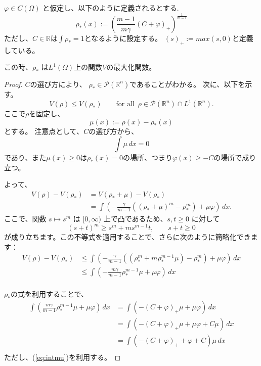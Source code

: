 \begin{lem}
    $\varphi \in C(\Omega)$ と仮定し、以下のように定義されるとする.
    $$
        \rho_*(x) := \left( \frac{m-1}{m\gamma}(C + \varphi)_+ \right)^{\frac{1}{m-1}} 
    $$
    ただし、$C \in \mathbb{R}$は$\int \rho_* = 1$となるように設定する。
    $(s)_+ := max(s, 0)$と定義している。

    この時、$\rho_*$ は$L^1(\Omega)$上の関数$V$の最大化関数。
\end{lem}
\begin{proof}
    $C$の選び方により、 $\rho_* \in \mathcal{P}(\mathbb{R}^n)$であることがわかる。
    次に、以下を示す。
    $$
    V(\rho) \leq V(\rho_*) \qquad \text{for all } \, \rho \in \mathcal{P}(\mathbb{R}^n) \cap L^1(\mathbb{R}^n).
    $$
    ここで$\rho$を固定し、 
    $$
    \mu(x) := \rho(x) - \rho_*(x)
    $$
    とする。
    注意点として、$C$の選び方から、
    \begin{equation}
        \label{eq:intmu}
        \int \mu \, dx = 0
    \end{equation}
    であり、また$\mu(x) \geq 0$は$\rho_*(x) = 0$の場所、つまり$\varphi(x) \geq -C$の場所で成り立つ。

    よって、
    \begin{align*}
        V(\rho) - V(\rho_*) &= V(\rho_* + \mu) - V(\rho_*)\\
                            &= \int \left(- \frac{\gamma}{m-1} ((\rho_* + \mu)^m - \rho_*^{m}) + \mu \varphi \right) \, dx.
    \end{align*}
    ここで、関数 $s \mapsto s^m$ は $[0, \infty)$ 上で凸であるため、$s, t \geq 0$ に対して 
    $$
        (s + t)^m \geq s^m + ms^{m-1}t, \qquad s + t \geq 0
    $$ 
    が成り立ちます。この不等式を適用することで、さらに次のように簡略化できます：
    \begin{align*}
        V(\rho) - V(\rho_*) &\leq \int \left(- \frac{\gamma}{m-1} ((\rho_*^m + m \rho_*^{m-1} \mu) - \rho_*^{m}) + \mu \varphi \right) \, dx\\
                            &\leq \int \left(- \frac{m\gamma}{m-1} \rho_*^{m-1}\mu + \mu\varphi\right) \, dx\\
    \end{align*}

    $\rho_*$の式を利用することで、
    \begin{align*}
        \int \left(\frac{m\gamma}{m-1} \rho_*^{m-1}\mu + \mu\varphi\right) \, dx &= \int \left(-(C + \varphi)_+ \mu + \mu\varphi\right) \, dx \\
                                                                        &= \int \left(-(C + \varphi)_+ \mu + \mu \varphi + C \mu\right) \, dx \\
                                                                        &= \int \left(-(C + \varphi)_+ + \varphi + C\right)\mu \, dx \\  
    \end{align*}
    ただし、(\ref{eq:intmu})を利用する。


\end{proof}
